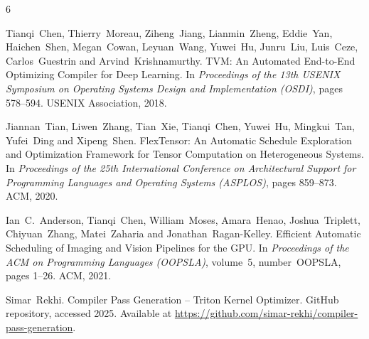 \documentclass{article}
\begin{document}

\begin{thebibliography}{6}

Tianqi~Chen, Thierry~Moreau, Ziheng~Jiang, Lianmin~Zheng, Eddie~Yan,
Haichen~Shen, Megan~Cowan, Leyuan~Wang, Yuwei~Hu, Junru~Liu, Luis~Ceze,
Carlos~Guestrin and Arvind~Krishnamurthy.
\newblock TVM: An Automated End-to-End Optimizing Compiler for Deep Learning.
\newblock In \emph{Proceedings of the 13th USENIX Symposium on Operating Systems Design and Implementation (OSDI)}, pages 578–594. USENIX Association, 2018.

Jiannan~Tian, Liwen~Zhang, Tian~Xie, Tianqi~Chen, Yuwei~Hu, Mingkui~Tan, Yufei~Ding and Xipeng~Shen.
\newblock FlexTensor: An Automatic Schedule Exploration and Optimization Framework for Tensor Computation on Heterogeneous Systems.
\newblock In \emph{Proceedings of the 25th International Conference on Architectural Support for Programming Languages and Operating Systems (ASPLOS)}, pages 859–873. ACM, 2020.

Ian~C.~Anderson, Tianqi~Chen, William~Moses, Amara~Henao, Joshua~Triplett, Chiyuan~Zhang, Matei~Zaharia and Jonathan~Ragan-Kelley.
\newblock Efficient Automatic Scheduling of Imaging and Vision Pipelines for the GPU.
\newblock In \emph{Proceedings of the ACM on Programming Languages (OOPSLA)}, volume~5, number~OOPSLA, pages 1–26. ACM, 2021.

Simar~Rekhi.
\newblock Compiler Pass Generation – Triton Kernel Optimizer.
\newblock GitHub repository, accessed 2025. Available at \url{https://github.com/simar-rekhi/compiler-pass-generation}.

\end{thebibliography}
\end{document}
